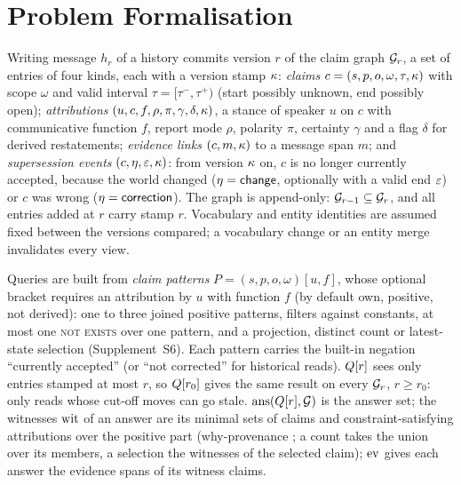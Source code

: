 \section{Problem Formalisation}\label{sec:preliminaries}\label{sec:formal}


Writing message $h_r$ of a history commits version $r$ of the claim graph $\mathcal G_r$, a set of
entries of four kinds, each with a version stamp $\kappa$:
\emph{claims} $c=(s,p,o,\omega,\tau,\kappa)$ with scope $\omega$ and valid interval
$\tau=[\tau^-,\tau^+)$ (start possibly unknown, end possibly open);
\emph{attributions} $(u,c,f,\rho,\pi,\gamma,\delta,\kappa)$, a stance of speaker $u$ on $c$ with
communicative function $f$, report mode $\rho$, polarity $\pi$, certainty $\gamma$ and a flag
$\delta$ for derived restatements;
\emph{evidence links} $(c,m,\kappa)$ to a message span $m$;
and \emph{supersession events} $(c,\eta,\varepsilon,\kappa)$: from version $\kappa$ on, $c$ is no longer
currently accepted, because the world changed ($\eta=\textsf{change}$, optionally with a valid end
$\varepsilon$) or $c$ was wrong ($\eta=\textsf{correction}$).
The graph is append-only: $\mathcal G_{r-1}\subseteq\mathcal G_r$, and all entries added at $r$ carry stamp $r$.
Vocabulary and entity identities are assumed fixed between the versions compared; a vocabulary
change or an entity merge invalidates every view.

Queries are built from \emph{claim patterns} $P=(s,p,o,\omega)[u,f]$, whose optional bracket
requires an attribution by $u$ with function $f$ (by default own, positive, not derived): one to
three joined positive patterns, filters against constants, at most one \textsc{not exists} over
one pattern, and a projection, distinct count or latest-state selection (Supplement~S6). Each
pattern carries the built-in negation ``currently accepted'' (or ``not corrected'' for historical
reads). $Q[r]$ sees only entries stamped at most $r$, so $Q[r_0]$ gives the same
result on every $\mathcal G_r$, $r\ge r_0$: only reads whose cut-off moves can go stale.
$\mathrm{ans}(Q[r],\mathcal G)$ is the answer set; the witnesses $\mathrm{wit}$ of an answer are its minimal sets
of claims and constraint-satisfying attributions over the positive part (why-provenance
\cite{buneman2001why}; a count takes the union over its members, a selection the witnesses of the
selected claim); $\mathrm{ev}$ gives each answer the evidence spans of its witness claims.

